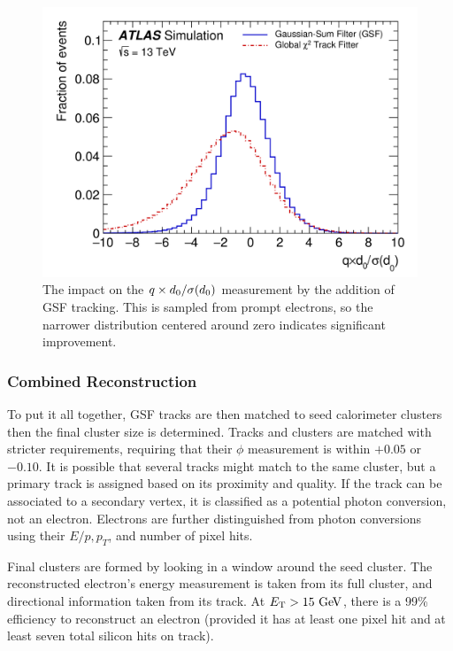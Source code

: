 \begin{figure}[htbp]
\centering
\includegraphics[width=.6\textwidth]{figures/EventReconstruction/elec-qxd0.png}
\caption{The impact on the $q \times d_{0} /\sigma(d_{0})$ measurement by the addition of \ac{GSF} tracking. This is sampled from prompt electrons, so the narrower distribution centered around zero indicates significant improvement.}
\label{fig:elec_gsf}
\end{figure}


\subsubsection{Combined Reconstruction}
To put it all together, \ac{GSF} tracks are then matched to seed calorimeter clusters then the final cluster size is determined. Tracks and clusters are matched with stricter requirements, requiring that their $\phi$ measurement is within $+0.05$ or $-0.10$. It is possible that several tracks might match to the same cluster, but a primary track is assigned based on its proximity and quality. If the track can be associated to a secondary vertex, it is classified as a potential photon conversion, not an electron. Electrons are further distinguished from photon conversions using their $E/p, p_{T}$, and number of pixel hits. 

Final clusters are formed by looking in a window around the seed cluster. The reconstructed electron's energy measurement is taken from its full cluster, and directional information taken from its track. At $\et > 15 \GeV$, there is a 99\% efficiency to reconstruct an electron (provided it has at least one pixel hit and at least seven total silicon hits on track). 

